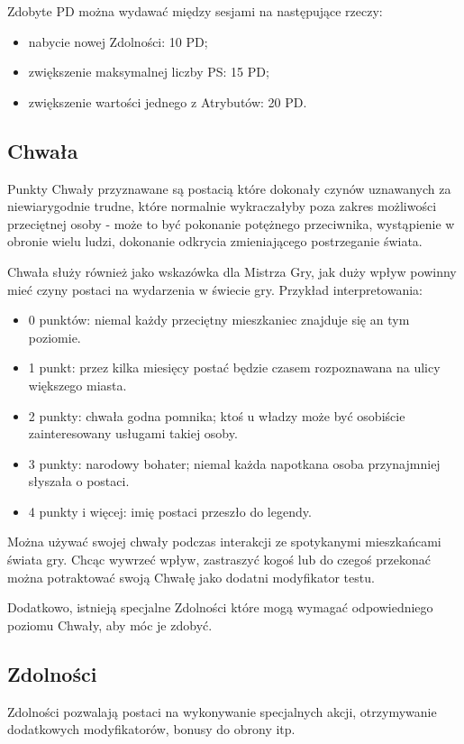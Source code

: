 \documentclass[10pt,a4paper]{book}
\begin{document}
\begin{multicols}{2}
Zdobyte PD można wydawać między sesjami na następujące rzeczy:
\begin{itemize}
	\item nabycie nowej Zdolności: 10 PD;
	\item zwiększenie maksymalnej liczby PS: 15 PD;
	\item zwiększenie wartości jednego z Atrybutów: 20 PD.
\end{itemize}


\subsection*{Chwała}
Punkty Chwały przyznawane są postacią które dokonały czynów uznawanych za niewiarygodnie trudne, które normalnie wykraczałyby poza zakres możliwości przeciętnej osoby - może to być pokonanie potężnego przeciwnika, wystąpienie w obronie wielu ludzi, dokonanie odkrycia zmieniającego postrzeganie świata.

Chwała służy również jako wskazówka dla Mistrza Gry, jak duży wpływ powinny mieć czyny postaci na wydarzenia w świecie gry. Przykład interpretowania:
\begin{itemize}
	\item 0 punktów: niemal każdy przeciętny mieszkaniec znajduje się an tym poziomie.
	\item 1 punkt: przez kilka miesięcy postać będzie czasem rozpoznawana na ulicy większego miasta.
	\item 2 punkty: chwała godna pomnika; ktoś u władzy może być osobiście zainteresowany usługami takiej osoby.
	\item 3 punkty: narodowy bohater; niemal każda napotkana osoba przynajmniej słyszała o postaci.
	\item 4 punkty i więcej: imię postaci przeszło do legendy.
\end{itemize}

Można używać swojej chwały podczas interakcji ze spotykanymi mieszkańcami świata gry. Chcąc wywrzeć wpływ, zastraszyć kogoś lub do czegoś przekonać można potraktować swoją Chwałę jako dodatni modyfikator testu.

Dodatkowo, istnieją specjalne Zdolności które mogą wymagać odpowiedniego poziomu Chwały, aby móc je zdobyć.


\subsection*{Zdolności}
Zdolności pozwalają postaci na wykonywanie specjalnych akcji, otrzymywanie dodatkowych modyfikatorów, bonusy do obrony itp.


\end{multicols}
\end{document}
